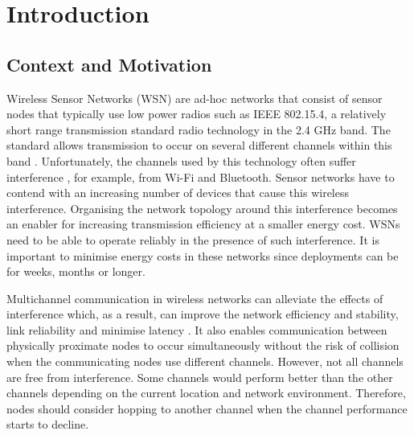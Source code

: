\chapter{Introduction}
\label{introduction}

\section{Context and Motivation}
Wireless Sensor Networks (WSN) are ad-hoc networks that consist of sensor nodes that typically use low power radios such as IEEE 802.15.4, a relatively short range transmission standard radio technology in the 2.4 GHz band. The standard allows transmission to occur on several different channels within this band \cite{ieee802.15.4}. Unfortunately, the channels used by this technology often suffer interference \cite{interferenceModel, ieeeCompare}, for example, from Wi-Fi \cite{ieee_2012, wu} and Bluetooth. Sensor networks have to contend with an increasing number of devices that cause this wireless interference. Organising the network topology around this interference becomes an enabler for increasing transmission efficiency at a smaller energy cost. WSNs need to be able to operate reliably in the presence of such interference. It is important to minimise energy costs in these networks since deployments can be for weeks, months or longer.

Multichannel communication in wireless networks can alleviate the effects of interference which, as a result, can improve the network efficiency and stability, link reliability and minimise latency \cite{watteyne}. It also enables communication between physically proximate nodes to occur simultaneously without the risk of collision when the communicating nodes use different channels. However, not all channels are free from interference. Some channels would perform better than the other channels depending on the current location and network environment. Therefore, nodes should consider hopping to another channel when the channel performance starts to decline.

